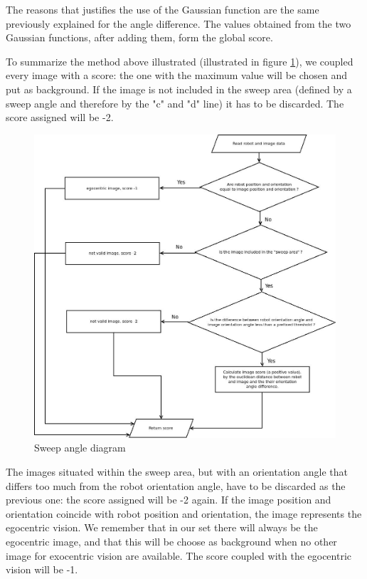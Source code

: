 %
The reasons that justifies the use of the Gaussian function are the same previously explained for the angle
difference. The values obtained from the two Gaussian functions, after adding them, form the global score.
%

%
To summarize the method above illustrated (illustrated in figure \ref{fig:sweep_angle_diagram}), we coupled
every image with a score: the one with the maximum value will be chosen and put as background. If the image is
not included in the sweep area (defined by a sweep angle and therefore by the "c" and "d" line) it has to be
discarded. The score assigned will be -2.
%
\begin{figure}[!h]
  \begin{center}
    \includegraphics[width=400pt]{img/sweep_angle_diagram.jpeg} 
    \caption{Sweep angle diagram}
    \label{fig:sweep_angle_diagram}
  \end{center}
\end{figure}

%
The images situated within the sweep area, but with an orientation angle that differs too much from the robot
orientation angle, have to be discarded as the previous one: the score assigned will be -2 again.
If the image position and orientation coincide with robot position and orientation, the image represents the
egocentric vision. We remember that in our set there will always be the egocentric image, and that this will be
choose as background when no other image for exocentric vision are available. The score coupled with the egocentric 
vision will be -1.
%

